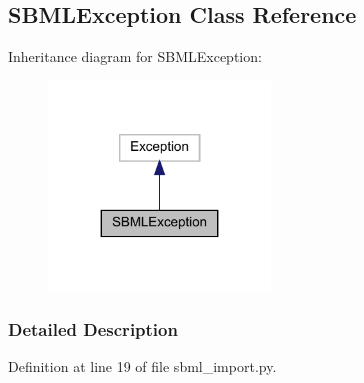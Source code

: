 \hypertarget{classamici_1_1sbml__import_1_1_s_b_m_l_exception}{}\subsection{S\+B\+M\+L\+Exception Class Reference}
\label{classamici_1_1sbml__import_1_1_s_b_m_l_exception}


Inheritance diagram for S\+B\+M\+L\+Exception\+:
\nopagebreak
\begin{figure}[H]
\begin{center}
\leavevmode
\includegraphics[width=167pt]{classamici_1_1sbml__import_1_1_s_b_m_l_exception__inherit__graph}
\end{center}
\end{figure}


\subsubsection{Detailed Description}


Definition at line 19 of file sbml\+\_\+import.\+py.

